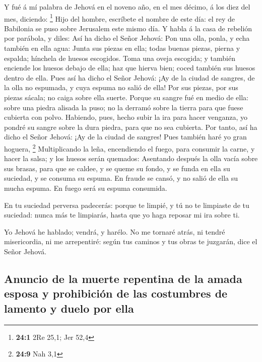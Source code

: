  Y fué á mí palabra de Jehová en el noveno año, en el mes
décimo, á los diez del mes, diciendo: \footnote{\textbf{24:1} 2Re 25,1;
  Jer 52,4}  Hijo del hombre, escríbete el nombre de este
día: el rey de Babilonia se puso sobre Jerusalem este mismo día.
 Y habla á la casa de rebelión por parábola, y diles: Así ha
dicho el Señor Jehová: Pon una olla, ponla, y echa también en ella agua:
 Junta sus piezas en ella; todas buenas piezas, pierna y
espalda; hínchela de huesos escogidos.  Toma una oveja
escogida; y también enciende los huesos debajo de ella; haz que hierva
bien; coced también sus huesos dentro de ella.  Pues así ha
dicho el Señor Jehová: ¡Ay de la ciudad de sangres, de la olla no
espumada, y cuya espuma no salió de ella! Por sus piezas, por sus piezas
sácala; no caiga sobre ella suerte.  Porque su sangre fué en
medio de ella: sobre una piedra alisada la puso; no la derramó sobre la
tierra para que fuese cubierta con polvo.  Habiendo, pues,
hecho subir la ira para hacer venganza, yo pondré su sangre sobre la
dura piedra, para que no sea cubierta.  Por tanto, así ha
dicho el Señor Jehová: ¡Ay de la ciudad de sangres! Pues también haré yo
gran hoguera, \footnote{\textbf{24:9} Nah 3,1} 
Multiplicando la leña, encendiendo el fuego, para consumir la carne, y
hacer la salsa; y los huesos serán quemados:  Asentando
después la olla vacía sobre sus brasas, para que se caldee, y se queme
su fondo, y se funda en ella su suciedad, y se consuma su espuma.
 En fraude se cansó, y no salió de ella su mucha espuma. En
fuego será su espuma consumida.

 En tu suciedad perversa padecerás: porque te limpié, y tú
no te limpiaste de tu suciedad: nunca más te limpiarás, hasta que yo
haga reposar mi ira sobre ti.

 Yo Jehová he hablado; vendrá, y harélo. No me tornaré
atrás, ni tendré misericordia, ni me arrepentiré: según tus caminos y
tus obras te juzgarán, dice el Señor Jehová.

\hypertarget{anuncio-de-la-muerte-repentina-de-la-amada-esposa-y-prohibiciuxf3n-de-las-costumbres-de-lamento-y-duelo-por-ella}{%
\subsection{Anuncio de la muerte repentina de la amada esposa y
prohibición de las costumbres de lamento y duelo por
ella}\label{anuncio-de-la-muerte-repentina-de-la-amada-esposa-y-prohibiciuxf3n-de-las-costumbres-de-lamento-y-duelo-por-ella}}

